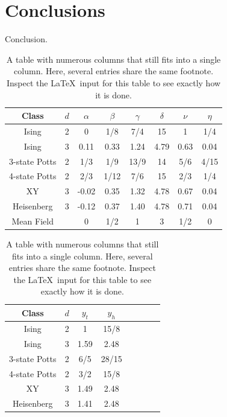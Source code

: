 \documentclass[%
 reprint,
 amsmath,amssymb,
 aps,
]{revtex4-2}
\begin{document}
\section{Conclusions}
Conclusion.


\begin{table}[b]
\caption{\label{tab:universality}
A table with numerous columns that still fits into a single column. 
Here, several entries share the same footnote. 
Inspect the \LaTeX\ input for this table to see exactly how it is done.}
\begin{ruledtabular}
\begin{tabular}{cccccccc}
Class &$d$ &$\alpha$ &$\beta $&$\gamma $&
$\delta$ &$\nu$ &$\eta$ \\
\hline
Ising & 2 & 0 & 1/8 & 7/4
& 15 & 1 & 1/4 \\
Ising & 3 & 0.11 & 0.33 & 1.24
& 4.79 & 0.63 & 0.04 \\
3-state Potts & 2 & 1/3 & 1/9 & 13/9
& 14 & 5/6 & 4/15 \\
4-state Potts & 2 & 2/3 & 1/12 & 7/6
& 15 & 2/3 & 1/4 \\
XY & 3 & -0.02 & 0.35 & 1.32
& 4.78 & 0.67 & 0.04 \\
Heisenberg & 3 & -0.12 & 0.37 & 1.40
& 4.78 & 0.71 & 0.04 \\
Mean Field &  & 0 & 1/2 & 1
& 3 & 1/2 & 0 \\
\end{tabular}
\end{ruledtabular}
\end{table}

\begin{table}[b]
\caption{\label{tab:exponent}
A table with numerous columns that still fits into a single column. 
Here, several entries share the same footnote. 
Inspect the \LaTeX\ input for this table to see exactly how it is done.}
\begin{ruledtabular}
\begin{tabular}{cccccccc}
Class &$d$ &$y_{t}$ &$y_{h}$\\
\hline
Ising & 2 & 1 & 15/8 \\
Ising & 3 & 1.59 & 2.48 \\
3-state Potts & 2 & 6/5 & 28/15 \\
4-state Potts & 2 & 3/2 & 15/8 \\
XY & 3 & 1.49 & 2.48 \\
Heisenberg & 3 & 1.41 & 2.48 \\
\end{tabular}
\end{ruledtabular}
\end{table}
\end{document}
